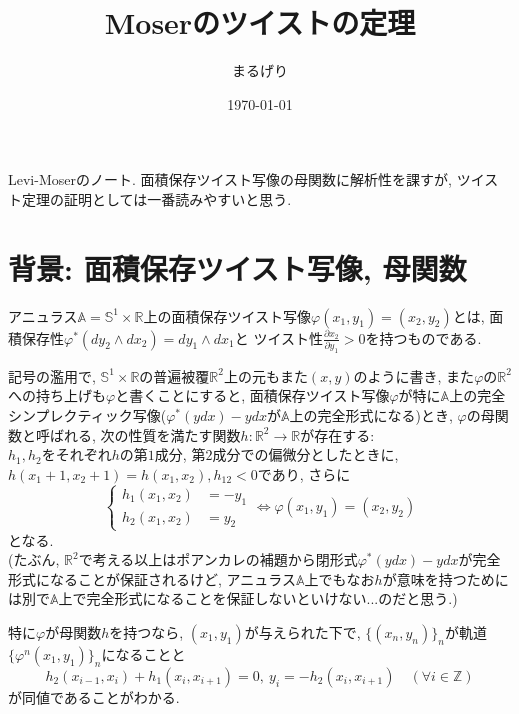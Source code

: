 \documentclass[a4paper]{ujarticle}
\title{Moserのツイストの定理}
\numberwithin{equation}{section}
\theoremstyle{definition}
\begin{document}
\date{\today}
\author{まるげり}
\maketitle
    Levi-Moser\cite{LM01}のノート. 
    面積保存ツイスト写像の母関数に解析性を課すが, ツイスト定理の証明としては一番読みやすいと思う. 

    \section{背景: 面積保存ツイスト写像, 母関数}
        アニュラス$\mathbb{A} = \mathbb{S}^1 \times \mathbb{R}$上の面積保存ツイスト写像$\varphi(x_1, y_1) = (x_2, y_2)$とは, 
        面積保存性$\varphi^{*}(dy_2 \wedge dx_2) = d y_1 \wedge d x_1$と
        ツイスト性$\displaystyle \frac{\partial x_2}{\partial y_1} > 0$を持つものである.

        記号の濫用で, $\mathbb{S}^1 \times \mathbb{R}$の普遍被覆$\mathbb{R}^2$上の元もまた$(x, y)$のように書き, 
        また$\varphi$の$\mathbb{R}^2$への持ち上げも$\varphi$と書くことにすると, 
        面積保存ツイスト写像$\varphi$が特に$\mathbb{A}$上の完全シンプレクティック写像($\varphi^{*}(y dx) - y dx$が$\mathbb{A}$上の完全形式になる)とき, 
        $\varphi$の母関数と呼ばれる, 次の性質を満たす関数$h: \mathbb{R}^2 \rightarrow \mathbb{R}$が存在する:\\
        $h_1, h_2$をそれぞれ$h$の第$1$成分, 第$2$成分での偏微分としたときに, $h(x_1 + 1, x_2 + 1) = h(x_1, x_2), h_{12} < 0$であり, 
        さらに
        \[
            \left\{
            \begin{aligned}
                h_1(x_1, x_2) &= - y_1 \\
                h_2(x_1, x_2) &= y_2
            \end{aligned}
            \right.
            \iff \varphi(x_1, y_1) = (x_2, y_2)
        \]
        となる.\\
        (たぶん, $\mathbb{R}^2$で考える以上はポアンカレの補題から閉形式$\varphi^{*}(y dx) - y dx$が完全形式になることが保証されるけど, 
        アニュラス$\mathbb{A}$上でもなお$h$が意味を持つためには別で$\mathbb{A}$上で完全形式になることを保証しないといけない...のだと思う.)
        
        特に$\varphi$が母関数$h$を持つなら, $(x_1, y_1)$が与えられた下で, $\{(x_n, y_n)\}_{n}$が軌道$\{\varphi^{n}(x_1, y_1)\}_{n}$になることと
        \[
                h_2(x_{i-1}, x_{i}) + h_1(x_{i}, x_{i+1}) = 0, \ y_i = - h_2(x_{i}, x_{i+1}) \quad (\forall i \in \mathbb{Z})
        \]
        が同値であることがわかる.
\end{document}
